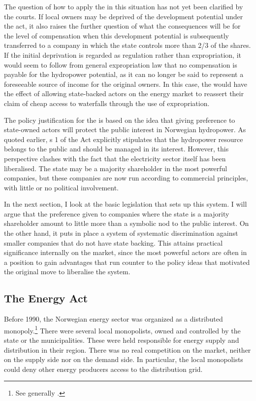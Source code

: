 The question of how to apply the \cite{ica17} in this situation has not yet been clarified by the courts. If local owners may be deprived of the development potential under the act, it also raises the further question of what the consequences will be for the level of compensation when this development potential is subsequently transferred to a company in which the state controls more than 2/3 of the shares. If the initial deprivation is regarded as regulation rather than expropriation, it would seem to follow from general expropriation law that no compensation is payable for the hydropower potential, as it can no longer be said to represent a foreseeable source of income for the original owners. In this case, the \cite{ica17} would have the effect of allowing state-backed actors on the energy market to reassert their claim of cheap access to waterfalls through the use of expropriation.

The policy justification for the \cite{ica17} is based on the idea that giving preference to state-owned actors will protect the public interest in Norwegian hydropower. As quoted earlier, s 1 of the Act explicitly stipulates that the hydropower resource belongs to the public and should be managed in its interest. However, this perspective clashes with the fact that the electricity sector itself has been liberalised. The state may be a majority shareholder in the most powerful companies, but these companies are now run according to commercial principles, with little or no political involvement.

In the next section, I look at the basic legislation that sets up this system. I will argue that the preference given to companies where the state is a majority shareholder amount to little more than a symbolic nod to the public interest. On the other hand, it puts in place a system of systematic discrimination against smaller companies that do not have state backing. This attains practical significance internally on the market, since the most powerful actors are often in a position to gain advantages that run counter to the policy ideas that motivated the original move to liberalise the system.

\subsection{The Energy Act}\label{sec:ea}

Before 1990, the Norwegian energy sector was organized as a distributed monopoly.\footnote{See generally \cite{bye05,skjold07}.} There were several local monopolists, owned and controlled by the state or the municipalities. These were held responsible for energy supply and distribution in their region. There was no real competition on the market, neither on the supply side nor on the demand side. In particular, the local monopolists could deny other energy producers access to the distribution grid.

